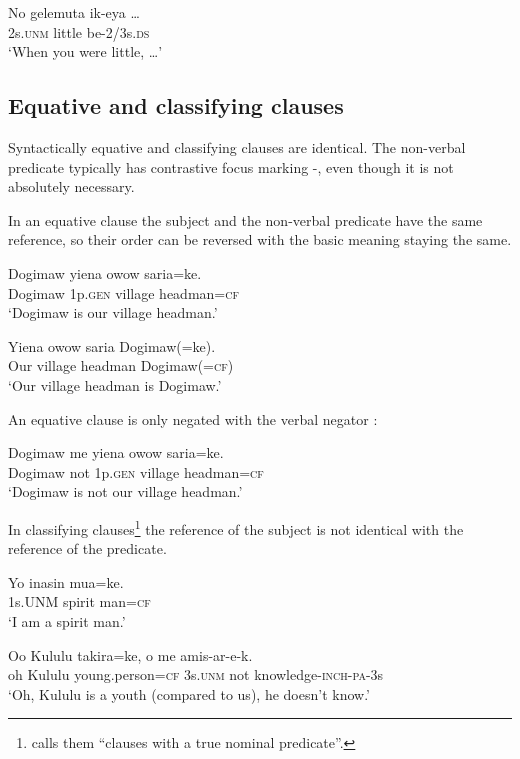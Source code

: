 \ea%
\label{ex:x987}
\gll No  gelemuta  ik-eya  {\dots} \\
     2s.\textsc{unm}  little  be-2/3s.\textsc{ds} \\
\glt `When you were little, {\dots}'
\z

\subsection{Equative and classifying clauses}
\hypertarget{RefHeading22181935131865}{}
Syntactically equative and classifying clauses are identical. The non-verbal predicate typically has contrastive focus marking -, even though it is not absolutely necessary. 

In an equative clause the subject and the non-verbal predicate have the same reference, so their order can be reversed with the basic meaning staying the same. 

\ea%
\label{ex:x975}
\gll Dogimaw  yiena  owow  saria=ke. \\
     Dogimaw  1p.\textsc{gen}  village  headman=\textsc{cf} \\
\glt `Dogimaw is our village headman.'
\z

\ea%
\label{ex:x976}
\gll Yiena  owow  saria  Dogimaw(=ke). \\
     Our  village  headman  Dogimaw(=\textsc{cf}) \\
\glt `Our village headman is Dogimaw.'
\z

An equative clause is only negated with the verbal negator :

\ea%
\label{ex:x1752}
\gll Dogimaw  me  yiena  owow  saria=ke. \\
     Dogimaw  not  1p.\textsc{gen}  village  headman=\textsc{cf} \\
\glt `Dogimaw is not our village headman.'
\z

In classifying clauses\footnote{\citet[233]{Dryer2007b} calls them ``clauses with a true nominal predicate''.} the reference of the subject is not identical with the reference of the predicate.

\ea%
\label{ex:x977}
\gll Yo  inasin  mua=ke. \\
     1s.UNM  spirit  man=\textsc{cf} \\
\glt `I am a spirit man.'
\z

\ea%
\label{ex:x978}
\gll Oo  Kululu  takira=ke,  o  me  amis-ar-e-k. \\
     oh  Kululu  young.person=\textsc{cf}  3s.\textsc{unm}  not  knowledge-\textsc{inch}-\textsc{pa}-3s \\
\glt `Oh, Kululu is a youth (compared to us), he doesn't know.'
\z

